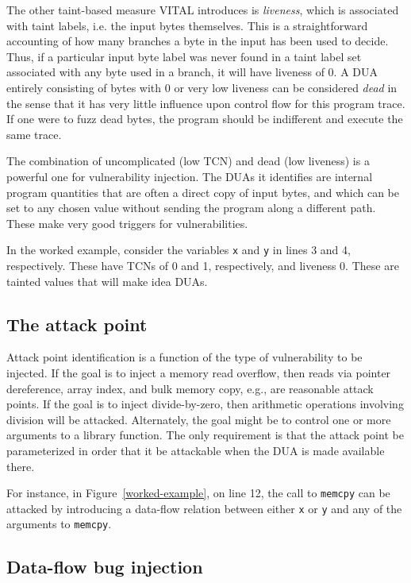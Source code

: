 

The other taint-based measure VITAL introduces is \emph{liveness}, which is associated with taint labels, i.e. the input bytes themselves.
This is a straightforward accounting of how many branches a byte in the input has been used to decide.
Thus, if a particular input byte label was never found in a taint label set associated with any byte used in a branch, it will have liveness of 0.
A DUA entirely consisting of bytes with 0 or very low liveness can be considered \emph{dead} in the sense that it has very little influence upon control flow for this program trace.
If one were to fuzz dead bytes, the program should be indifferent and execute the same trace.  

The combination of uncomplicated (low TCN) and dead (low liveness) is a powerful one for vulnerability injection.
The DUAs it identifies are internal program quantities that are often a direct copy of input bytes, and which can be set to any chosen value without sending the program along a different path.  
These make very good triggers for vulnerabilities.

In the worked example, consider the variables \verb+x+ and \verb+y+ in lines 3 and 4, respectively.
These have TCNs of 0 and 1, respectively, and liveness 0. 
These are tainted values that will make idea DUAs.

\subsection {The attack point}

Attack point identification is a function of the type of vulnerability to be injected.
If the goal is to inject a memory read overflow, then reads via pointer dereference, array index, and bulk memory copy, e.g., are reasonable attack points.  
If the goal is to inject divide-by-zero, then arithmetic operations involving division will be attacked. 
Alternately, the goal might be to control one or more arguments to a library function.
The only requirement is that the attack point be parameterized in order that it be attackable when the DUA is made available there. 

For instance, in Figure~\ref{worked-example}, on line 12, the call to \verb+memcpy+ can be attacked by introducing a data-flow relation between either \verb+x+ or \verb+y+ 
and any of the arguments to \verb+memcpy+.

\subsection {Data-flow bug injection}


